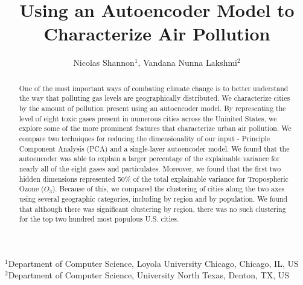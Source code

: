 \documentclass{article}
\title{Using an Autoencoder Model to Characterize Air Pollution}
\author{Nicolas Shannon$^{1}$, Vandana Nunna Lakshmi$^{2}$}
\date{}
\newcommand\note[1]{\textbf{\textcolor{red}{#1}}}
\begin{document}
\setlength{\parindent}{3ex}
\setlength{\parskip}{0.25ex}

\begin{centering}
\maketitle
\vspace{-0.50cm}
\scriptsize
{$^{1}$Department of Computer Science, Loyola University Chicago, Chicago, IL, US}\\
{$^{2}$Department of Computer Science, University North Texas, Denton, TX, US}\\
\end{centering}

\begin{abstract}

One of the most important ways of combating climate change is to better understand the way that polluting gas levels are geographically distributed. We characterize cities by the amount of pollution present using an autoencoder model. By representing the level of eight toxic gases present in numerous cities across the Uninited States, we explore some of the more prominent features that characterize urban air pollution. We compare two techniques for reducing the dimensionality of our input - Principle Component Analysis (PCA) and a single-layer autoencoder model. We found that the autoencoder was able to explain a larger percentage of the explainable variance for nearly all of the eight gases and particulates. Moreover, we found that the first two hidden dimensions represented 50\% of the total explainable variance for Tropospheric Ozone ($O_3$). Because of this, we compared the clustering of cities along the two axes using several geographic categories, including by region and by population. We found that although there was significant clustering by region, there was no such clustering for the top two hundred most populous U.S. cities.

\end{abstract}
\end{document}
